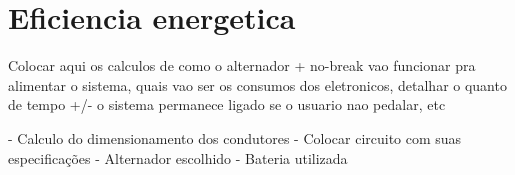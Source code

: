 \section{Eficiencia energetica}
Colocar aqui os calculos de como o alternador + no-break vao funcionar pra alimentar o sistema, quais vao ser os consumos dos eletronicos, detalhar o quanto de tempo +/- o sistema permanece ligado se o usuario nao pedalar, etc

- Calculo do dimensionamento dos condutores
- Colocar circuito com suas especificações
- Alternador escolhido
- Bateria utilizada
